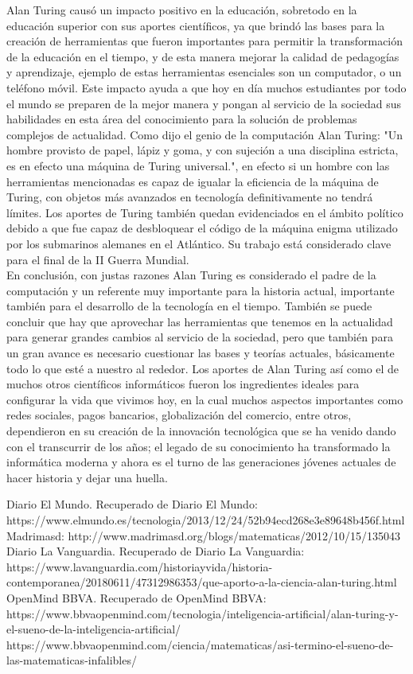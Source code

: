 \documentclass[a4paper]{article}
\begin{document}
Alan Turing causó un impacto positivo en la educación, sobretodo en la educación superior con sus aportes científicos, ya que brindó las bases para la creación de herramientas que fueron importantes para permitir la transformación de la educación en el tiempo, y de esta manera mejorar la calidad de pedagogías y aprendizaje, ejemplo de estas herramientas esenciales son un computador, o un teléfono móvil. Este impacto ayuda a que hoy en día muchos estudiantes por todo el mundo se preparen de la mejor manera y pongan al servicio de la sociedad sus habilidades en esta área del conocimiento para la solución de problemas complejos de actualidad. Como dijo el genio de la computación Alan Turing: "Un hombre provisto de papel, lápiz y goma, y con sujeción a una disciplina estricta, es en efecto una máquina de Turing universal.", en efecto si un hombre con las herramientas mencionadas es capaz de igualar la eficiencia de la máquina de Turing, con objetos más avanzados en tecnología definitivamente no tendrá límites. Los aportes de Turing también quedan evidenciados en el ámbito político debido a que fue capaz de desbloquear el código de la máquina enigma utilizado por los submarinos alemanes en el Atlántico. Su trabajo está considerado clave para el final de la II Guerra Mundial.\\

En conclusión, con justas razones Alan Turing es considerado el padre de la computación y un referente muy importante para la historia actual, importante también para el desarrollo de la tecnología en el tiempo. También se puede concluir que hay que aprovechar las herramientas que tenemos en la actualidad para generar grandes cambios al servicio de la sociedad, pero que también para un gran avance es necesario cuestionar las bases y teorías actuales, básicamente todo lo que esté a nuestro al rededor. Los aportes de Alan Turing así como el de muchos otros científicos informáticos fueron los ingredientes ideales para configurar la vida que vivimos hoy, en la cual muchos aspectos importantes como redes sociales, pagos bancarios, globalización del comercio, entre otros, dependieron en su creación de la innovación tecnológica que se ha venido dando con el transcurrir de los años; el legado de su conocimiento ha transformado la informática moderna y ahora es el turno de las generaciones jóvenes actuales de hacer historia y dejar una huella. 

\begin{thebibliography}{X}
Diario El Mundo. Recuperado de Diario El Mundo: 
https://www.elmundo.es/tecnologia/2013/12/24/52b94ecd268e3e89648b456f.html
Madrimasd: 
http://www.madrimasd.org/blogs/matematicas/2012/10/15/135043
Diario La Vanguardia. Recuperado de Diario La Vanguardia: 
https://www.lavanguardia.com/historiayvida/historia-contemporanea/20180611/47312986353/que-aporto-a-la-ciencia-alan-turing.html
OpenMind BBVA. Recuperado de OpenMind BBVA: 
https://www.bbvaopenmind.com/tecnologia/inteligencia-artificial/alan-turing-y-el-sueno-de-la-inteligencia-artificial/
https://www.bbvaopenmind.com/ciencia/matematicas/asi-termino-el-sueno-de-las-matematicas-infalibles/
\end{thebibliography}
\end{document}
